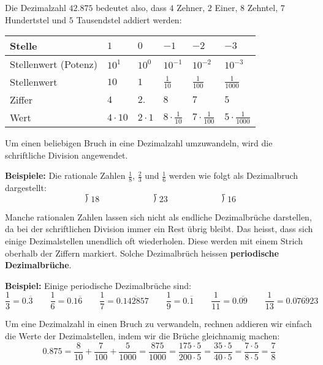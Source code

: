 Die Dezimalzahl $42.875$ bedeutet also, dass $4$ Zehner, $2$ Einer, $8$ Zehntel, $7$ Hundertstel und $5$ Tausendstel addiert werden:
\begin{center}
  \renewcommand{\arraystretch}{1.3}
  \begin{tabularx}{0.9\textwidth}{lCCCCC}
  \toprule
    Stelle & $1$ & $0$ & $-1$ & $-2$ & $-3$ \\
  \midrule
    Stellenwert (Potenz) & $10^{1}$ & $10^{0}$ & $10^{-1}$ & $10^{-2}$ & $10^{-3}$ \\
  \midrule
    Stellenwert & $10$ & $1$ & $\frac{1}{10}$ & $\frac{1}{100}$ & $\frac{1}{1000}$ \\
  \midrule
    Ziffer & $4$ & $2.$ & $8$ & $7$ & $5$ \\
  \midrule
    Wert & $4\cdot 10$ & $2\cdot 1$ & $8\cdot\frac{1}{10}$ & $7\cdot\frac{1}{100}$ & $5\cdot\frac{1}{1000}$ \\
  \bottomrule
  \end{tabularx}
\end{center}
Um einen beliebigen Bruch in eine Dezimalzahl umzuwandeln, wird die schriftliche Division angewendet.
\begin{example}
  \textbf{Beispiele:} Die rationale Zahlen $\frac{1}{8}$, $\frac{2}{3}$ und $\frac{1}{6}$ werden wie folgt als Dezimalbruch dargestellt:
  \[
    \longdivision{1}{8} \qquad\qquad\qquad \longdivision{2}{3} \qquad\qquad\qquad \longdivision{1}{6}
  \]
\end{example}
Manche rationalen Zahlen lassen sich nicht als endliche Dezimalbrüche darstellen, da bei der schriftlichen Division immer ein Rest übrig bleibt. Das heisst, dass sich einige Dezimalstellen unendlich oft wiederholen. Diese werden mit einem Strich oberhalb der Ziffern markiert. Solche Dezimalbrüch heissen \textbf{periodische Dezimalbrüche}.
\begin{example}
  \textbf{Beispiel:} Einige periodische Dezimalbrüche sind:
  \[
    \frac{1}{3} = 0.\overline{3} \qquad
    \frac{1}{6} = 0.1\overline{6} \qquad
    \frac{1}{7} = 0.\overline{142857} \qquad
    \frac{1}{9} = 0.\overline{1} \qquad
    \frac{1}{11} = 0.\overline{09} \qquad
    \frac{1}{13} = 0.\overline{076923}
  \]
\end{example}
Um eine Dezimalzahl in einen Bruch zu verwandeln, rechnen addieren wir einfach die Werte der Dezimalstellen, indem wir die Brüche gleichnamig machen:
\[
  0.875 = \frac{8}{10} + \frac{7}{100} + \frac{5}{1000} = \frac{875}{1000} =\frac{175\cdot 5}{200\cdot 5} = \frac{35\cdot 5}{40\cdot 5} = \frac{7\cdot 5}{8\cdot 5} = \frac{7}{8}
\]
